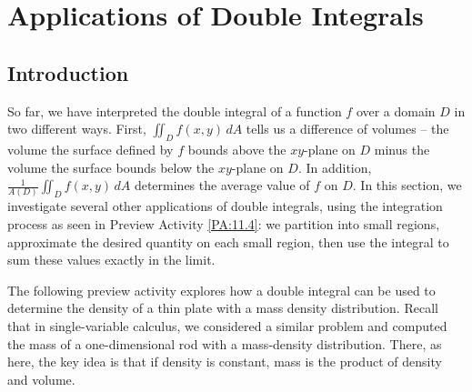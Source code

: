 \section{Applications of Double Integrals} \label{S:11.4.Double_Integrals_Applications}

\vspace*{-14 pt}

\subsection*{Introduction}

So far, we have interpreted the double integral of a function $f$ over a domain $D$ in two different ways. First, $\iint_D f(x,y) \, dA$ tells us a difference of volumes -- the volume the surface defined by $f$ bounds above the $xy$-plane on $D$ minus the volume the surface bounds below the $xy$-plane on $D$.  In addition, $\frac{1}{A(D)} \iint_D f(x,y) \, dA$ determines the average value of $f$ on $D$. In this section, we investigate several other applications of double integrals, using the integration process as seen in Preview Activity \ref{PA:11.4}: we partition into small regions, approximate the  desired quantity on each small region, then use the integral to sum these values exactly in the limit.

The following preview activity explores how a double integral can be used to determine the density of a thin plate with a mass density distribution.  Recall that in single-variable calculus, we considered a similar problem and computed the mass of a one-dimensional rod with a mass-density distribution.  There, as here, the key idea is that if density is constant, mass is the product of density and volume.

